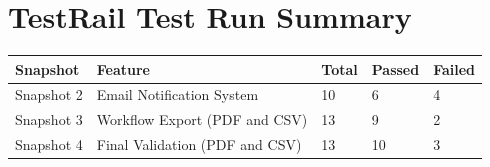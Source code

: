 \documentclass[12pt]{article}
\begin{document}
\section{TestRail Test Run Summary}
 
\begin{center}
\begin{tabular}{lllll}
\toprule
Snapshot & Feature & Total & Passed & Failed \\
\midrule
Snapshot 2 & Email Notification System      & 10 & 6  & 4 \\
Snapshot 3 & Workflow Export (PDF and CSV)  & 13 & 9  & 2 \\
Snapshot 4 & Final Validation (PDF and CSV) & 13 & 10 & 3 \\
\bottomrule
\end{tabular}
\end{center}

 
\end{document}
